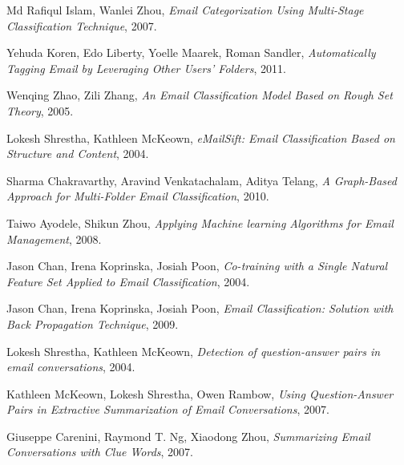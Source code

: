 \documentclass[12pt]{article}
\begin{document}
\begin{thebibliography}{99}
  Md Rafiqul Islam,
  Wanlei Zhou,
  \emph{Email Categorization Using Multi-Stage Classification Technique},
  2007.

  Yehuda Koren,
  Edo Liberty,
  Yoelle Maarek,
  Roman Sandler,
  \emph{Automatically Tagging Email by Leveraging Other Users' Folders},
  2011.

  Wenqing Zhao,
  Zili Zhang,
  \emph{An Email Classification Model Based on Rough Set Theory},
  2005.

  Lokesh Shrestha,
  Kathleen McKeown,
  \emph{eMailSift: Email Classification Based on Structure and Content},
  2004.

  Sharma Chakravarthy,
  Aravind Venkatachalam,
  Aditya Telang,
  \emph{ A Graph-Based Approach for Multi-Folder Email Classification},
  2010.

  Taiwo Ayodele,
  Shikun Zhou,
  \emph{Applying Machine learning Algorithms for Email Management},
  2008.

  Jason Chan,
  Irena Koprinska,
  Josiah Poon,
  \emph{Co-training with a Single Natural Feature Set Applied to Email Classification},
  2004.

  Jason Chan,
  Irena Koprinska,
  Josiah Poon,
  \emph{Email Classification: Solution with Back Propagation Technique},
  2009.

  Lokesh Shrestha,
  Kathleen McKeown,
  \emph{Detection of question-answer pairs in email conversations},
  2004.

  Kathleen McKeown,
  Lokesh Shrestha,
  Owen Rambow,
  \emph{Using Question-Answer Pairs in Extractive Summarization of Email Conversations},
  2007.

  Giuseppe Carenini,
  Raymond T. Ng,
  Xiaodong Zhou,
  \emph{Summarizing Email Conversations with Clue Words},
  2007.
\end{thebibliography}
\end{document}
